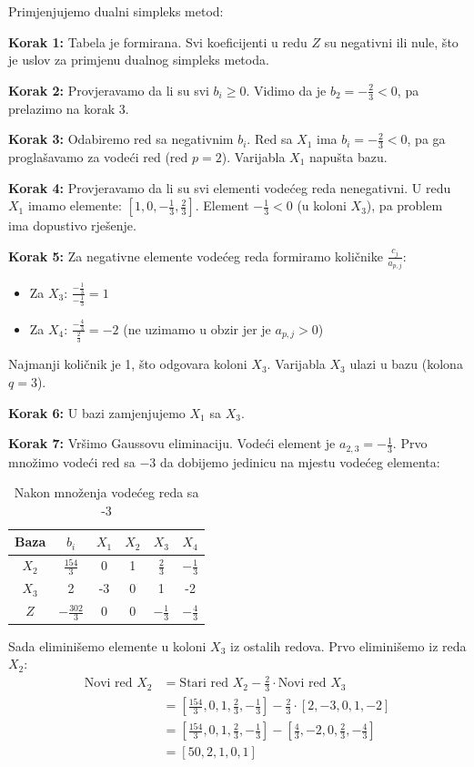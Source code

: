 \documentclass[12pt,a4paper]{article}
\begin{document}
Primjenjujemo dualni simpleks metod:

\textbf{Korak 1:} Tabela je formirana. Svi koeficijenti u redu $Z$ su negativni ili nule, što je uslov za primjenu dualnog simpleks metoda.

\textbf{Korak 2:} Provjeravamo da li su svi $b_i \geq 0$. Vidimo da je $b_2 = -\frac{2}{3} < 0$, pa prelazimo na korak 3.

\textbf{Korak 3:} Odabiremo red sa negativnim $b_i$. Red sa $X_1$ ima $b_i = -\frac{2}{3} < 0$, pa ga proglašavamo za vodeći red (red $p = 2$). Varijabla $X_1$ napušta bazu.

\textbf{Korak 4:} Provjeravamo da li su svi elementi vodećeg reda nenegativni. U redu $X_1$ imamo elemente: $[1, 0, -\frac{1}{3}, \frac{2}{3}]$. Element $-\frac{1}{3} < 0$ (u koloni $X_3$), pa problem ima dopustivo rješenje.

\textbf{Korak 5:} Za negativne elemente vodećeg reda formiramo količnike $\frac{c_j}{a_{p,j}}$:
\begin{itemize}
\item Za $X_3$: $\frac{-\frac{1}{3}}{-\frac{1}{3}} = 1$
\item Za $X_4$: $\frac{-\frac{4}{3}}{\frac{2}{3}} = -2$ (ne uzimamo u obzir jer je $a_{p,j} > 0$)
\end{itemize}

Najmanji količnik je 1, što odgovara koloni $X_3$. Varijabla $X_3$ ulazi u bazu (kolona $q = 3$).

\textbf{Korak 6:} U bazi zamjenjujemo $X_1$ sa $X_3$.

\textbf{Korak 7:} Vršimo Gaussovu eliminaciju. Vodeći element je $a_{2,3} = -\frac{1}{3}$. Prvo množimo vodeći red sa $-3$ da dobijemo jedinicu na mjestu vodećeg elementa:

\begin{table}[H]
\centering
\begin{tabular}{|c|c|c|c|c|c|}
\hline
Baza & $b_i$ & $X_1$ & $X_2$ & $X_3$ & $X_4$ \\
\hline
$X_2$ & $\frac{154}{3}$ & 0 & 1 & $\frac{2}{3}$ & $-\frac{1}{3}$ \\
\hline
$X_3$ & 2 & -3 & 0 & 1 & -2 \\
\hline
$Z$ & $-\frac{302}{3}$ & 0 & 0 & $-\frac{1}{3}$ & $-\frac{4}{3}$ \\
\hline
\end{tabular}
\caption{Nakon množenja vodećeg reda sa -3}
\end{table}

Sada eliminišemo elemente u koloni $X_3$ iz ostalih redova. Prvo eliminišemo iz reda $X_2$:
\begin{align}
\text{Novi red } X_2 &= \text{Stari red } X_2 - \frac{2}{3} \cdot \text{Novi red } X_3 \\
&= \left[\frac{154}{3}, 0, 1, \frac{2}{3}, -\frac{1}{3}\right] - \frac{2}{3} \cdot [2, -3, 0, 1, -2] \\
&= \left[\frac{154}{3}, 0, 1, \frac{2}{3}, -\frac{1}{3}\right] - \left[\frac{4}{3}, -2, 0, \frac{2}{3}, -\frac{4}{3}\right] \\
&= \left[50, 2, 1, 0, 1\right]
\end{align}
\end{document}
